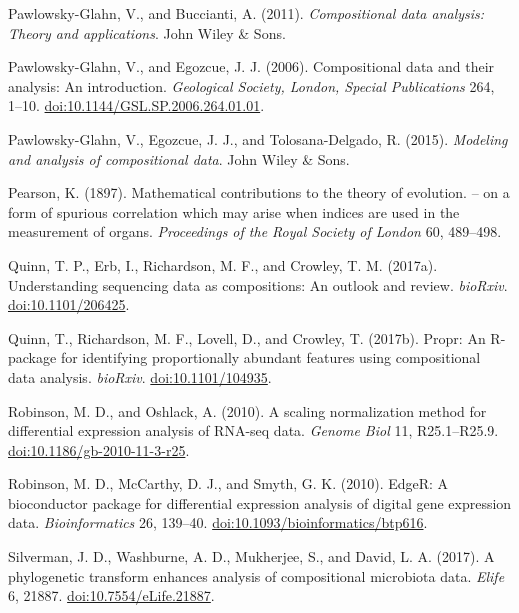 \documentclass[twocolumn]{article}
\begin{document}
Pawlowsky-Glahn, V., and Buccianti, A. (2011). \emph{Compositional data
analysis: Theory and applications}. John Wiley \& Sons.

Pawlowsky-Glahn, V., and Egozcue, J. J. (2006). Compositional data and
their analysis: An introduction. \emph{Geological Society, London,
Special Publications} 264, 1--10.
\href{http://doi.org/10.1144/GSL.SP.2006.264.01.01}{doi:10.1144/GSL.SP.2006.264.01.01}.

Pawlowsky-Glahn, V., Egozcue, J. J., and Tolosana-Delgado, R. (2015).
\emph{Modeling and analysis of compositional data}. John Wiley \& Sons.

Pearson, K. (1897). Mathematical contributions to the theory of
evolution. -- on a form of spurious correlation which may arise when
indices are used in the measurement of organs. \emph{Proceedings of the
Royal Society of London} 60, 489--498.

Quinn, T. P., Erb, I., Richardson, M. F., and Crowley, T. M. (2017a).
Understanding sequencing data as compositions: An outlook and review.
\emph{bioRxiv}.
\href{http://doi.org/10.1101/206425}{doi:10.1101/206425}.

Quinn, T., Richardson, M. F., Lovell, D., and Crowley, T. (2017b).
Propr: An R-package for identifying proportionally abundant features
using compositional data analysis. \emph{bioRxiv}.
\href{http://doi.org/10.1101/104935}{doi:10.1101/104935}.

Robinson, M. D., and Oshlack, A. (2010). A scaling normalization method
for differential expression analysis of RNA-seq data. \emph{Genome Biol}
11, R25.1--R25.9.
\href{http://doi.org/10.1186/gb-2010-11-3-r25}{doi:10.1186/gb-2010-11-3-r25}.

Robinson, M. D., McCarthy, D. J., and Smyth, G. K. (2010). EdgeR: A
bioconductor package for differential expression analysis of digital
gene expression data. \emph{Bioinformatics} 26, 139--40.
\href{http://doi.org/10.1093/bioinformatics/btp616}{doi:10.1093/bioinformatics/btp616}.

Silverman, J. D., Washburne, A. D., Mukherjee, S., and David, L. A.
(2017). A phylogenetic transform enhances analysis of compositional
microbiota data. \emph{Elife} 6, 21887.
\href{http://doi.org/10.7554/eLife.21887}{doi:10.7554/eLife.21887}.
\end{document}
